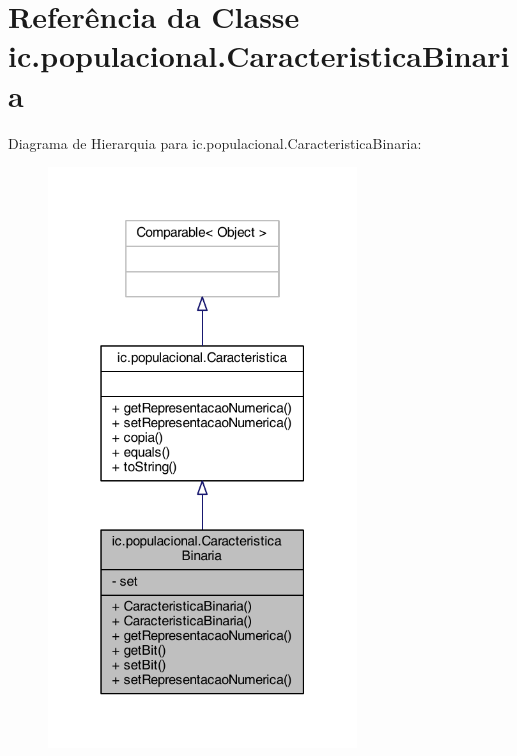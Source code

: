 \hypertarget{classic_1_1populacional_1_1_caracteristica_binaria}{\section{Referência da Classe ic.\-populacional.\-Caracteristica\-Binaria}
\label{classic_1_1populacional_1_1_caracteristica_binaria}
}


Diagrama de Hierarquia para ic.\-populacional.\-Caracteristica\-Binaria\-:\nopagebreak
\begin{figure}[H]
\begin{center}
\leavevmode
\includegraphics[width=232pt]{classic_1_1populacional_1_1_caracteristica_binaria__inherit__graph}
\end{center}
\end{figure}



